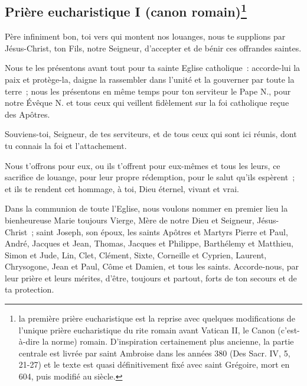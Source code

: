 \subsection*{Prière eucharistique I (canon romain)\footnote{la première prière eucharistique est la reprise avec quelques modifications de l’unique 
prière eucharistique du rite romain avant Vatican II, le Canon 
(c’est-à-dire la norme) romain. D'inspiration certainement plus ancienne,
la partie centrale est livrée par saint Ambroise dans les années 380 
(Des Sacr. IV, 5, 21-27) et le texte est quasi définitivement fixé avec
saint Grégoire, mort en 604, puis modifié au  siècle. }}\label{pe1} 







Père infiniment bon, toi vers qui montent nos louanges, nous te supplions
par Jésus-Christ, ton Fils, notre Seigneur,  d'accepter et de bénir 
ces offrandes saintes.

Nous te les présentons avant tout pour ta sainte Eglise catholique~:
accorde-lui la paix et protège-la, daigne la rassembler dans l'unité et la
gouverner par toute la terre~; nous les présentons en même temps pour ton
serviteur le Pape N., pour notre Évêque N. et tous ceux
qui veillent fidèlement sur la foi catholique reçue des Apôtres.

Souviens-toi, Seigneur, de tes serviteurs, et de tous 
ceux qui sont ici réunis, dont tu connais la foi et l'attachement. 


Nous t'offrons pour eux, ou ils t'offrent pour eux-mêmes et tous les leurs, ce
sacrifice de louange, pour leur propre rédemption, pour le salut qu'ils
espèrent~; et ils te rendent cet hommage, à toi, Dieu éternel, vivant et
vrai.

Dans la communion de toute l'Eglise, nous voulons nommer en premier lieu la
bienheureuse Marie toujours Vierge, Mère de notre Dieu et Seigneur,
Jésus-Christ~; saint Joseph, son époux, les saints Apôtres et Martyrs Pierre
et Paul, André, Jacques et Jean, Thomas, Jacques et Philippe, Barthélemy et
Matthieu, Simon et Jude, Lin, Clet, Clément, Sixte, Corneille et Cyprien,
Laurent, Chrysogone, Jean et Paul, Côme et Damien, et tous les saints.
Accorde-nous, par leur prière et leurs mérites, d'être, toujours et partout,
forts de ton secours et de ta protection.

